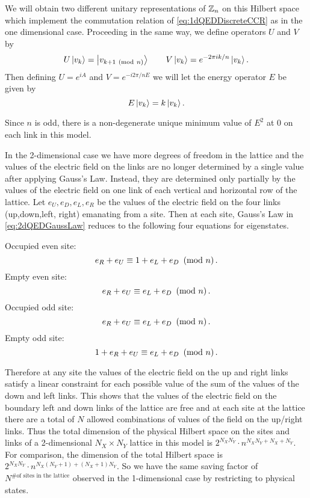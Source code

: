 \documentclass[10pt,reqno]{amsart}
\begin{document}
	We will obtain two different unitary representations of $\mathbb{Z}_n$ on this Hilbert space which implement the commutation relation of \cref{eq:1dQEDDiscreteCCR} as in the one dimensional case.
	Proceeding in the same way, we define operators $U$ and $V$ by
	\begin{equation}
		U\ket{v_k}=\ket{v_{k+1 \ \left(\mathrm{mod}\ n\right)}} \qquad V\ket{v_k}= e^{-2\pi i k/n} \ket{v_k}.
	\end{equation}
	Then defining $U=e^{iA}$ and $V=e^{-i2\pi/n E}$ we will let the energy operator $E$ be given by
	\begin{equation}
		E\ket{v_k}=k\ket{v_k}.
	\end{equation}
	
	Since $n$ is odd, there is a non-degenerate unique minimum value of $E^2$ at 0 on each link in this model.
	
	In the 2-dimensional case we have more degrees of freedom in the lattice and the values of the electric field on the links are no longer determined by a single value after applying Gauss's Law.
	Instead, they are determined only partially by the values of the electric field on one link of each vertical and horizontal row of the lattice. 
	Let $e_U,e_D,e_L,e_R$ be the values of the electric field on the four links (up,down,left, right) emanating from a site.
	Then at each site, Gauss's Law in \cref{eq:2dQEDGaussLaw} reduces to the following four equations for eigenstates.
	
	Occupied even site:
		\[ e_R+e_U \equiv 1+e_L+e_D \ \left(\mathrm{mod}\ n\right). \]
	Empty even site:
		\[ e_R+e_U \equiv e_L+e_D \ \left(\mathrm{mod}\ n\right). \]
	Occupied odd site:
		\[ e_R+e_U \equiv e_L+e_D \ \left(\mathrm{mod}\ n\right). \]
	Empty odd site:
		\[ 1+e_R+e_U \equiv e_L+e_D \ \left(\mathrm{mod}\ n\right). \]
	
	Therefore at any site the values of the electric field on the up and right links satisfy a linear constraint for each possible value of the sum of the values of the down and left links.
	This shows that the values of the electric field on the boundary left and down links of the lattice are free and at each site at the lattice there are a total of $N$ allowed combinations of values of the field on the up/right links.
	Thus the total dimension of the physical Hilbert space on the sites and links of a 2-dimensional $N_X\times N_Y$ lattice in this model is $2^{N_X N_Y} \cdot n^{N_X N_Y + N_X+ N_Y}$.
	For comparison, the dimension of the total Hilbert space is $2^{N_X N_Y} \cdot n^{N_X(N_Y+1)+(N_X+1)N_Y}$.
	So we have the same saving factor of $N^{\text{\# of sites in the lattice}}$ observed in the 1-dimensional case by restricting to physical states.\\
	
\end{document}
